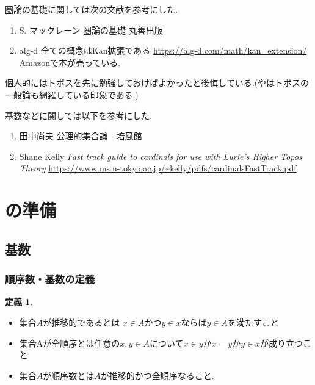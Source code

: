 \documentclass[dvipdfmx,a4paper,11pt]{article}
\theoremstyle{definition}
\newtheorem{dfn}[thm]{定義}
\begin{document}
圏論の基礎に関しては次の文献を参考にした.
\begin{enumerate}
\item \cite{Mac} S. マックレーン 圏論の基礎 丸善出版
\item \cite{alg}
alg-d 全ての概念はKan拡張である
\url{https://alg-d.com/math/kan_extension/} \\
Amazonで本が売っている. 
\end{enumerate}
個人的にはトポスを先に勉強しておけばよかったと後悔している.(\cite{Stum}や\cite{Bar22}はトポスの一般論も網羅している印象である.)

基数などに関しては以下を参考にした. 
\begin{enumerate}
\item \cite{Tana}
田中尚夫 公理的集合論　培風館
\item \cite{Sha2}
Shane Kelly
\textit{Fast track guide to cardinals for use with Lurie’s Higher Topos Theory}
\url{https://www.ms.u-tokyo.ac.jp/~kelly/pdfs/cardinalsFastTrack.pdf}
\end{enumerate}



\section{\cite[Proposition 2.9]{Sch19}の準備}

\subsection{基数}
\subsubsection{順序数・基数の定義}
 
 \begin{tcolorbox}
 [colback = white, colframe = green!35!black, fonttitle = \bfseries,breakable = true]
\begin{dfn}
\begin{itemize}
\item 集合$A$が推移的であるとは
$x \in A$かつ$y \in x$ならば$y \in A$を満たすこと
\item 集合Aが全順序とは任意の$x,y \in A$について$x \in y$か$x=y$か$y \in x$が成り立つこと
\item 集合$A$が順序数とは$A$が推移的かつ全順序なること. 
\end{itemize}
\end{dfn}
\end{tcolorbox}
\end{document}
